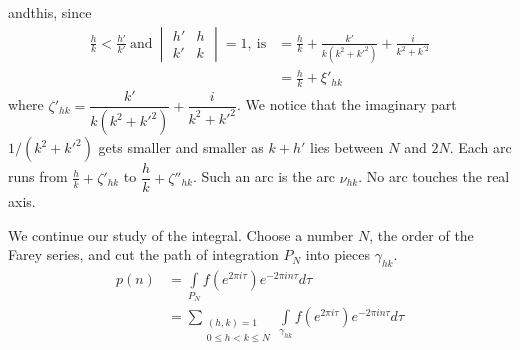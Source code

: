 \begin{figure}[H]
\end{figure}

\noindent and\pageoriginale this, since 
\begin{align*}
  \frac{h}{k}< \frac{h'}{k'} ~\text{and}~ 
  \begin{vmatrix}h' & h\\ k'&k \end{vmatrix}=1, ~\text{is} & =
  \frac{h}{k} + \frac{k'}{k(k^2 + k'^2)} + \frac{i}{k^2 + k^{'2}}\\
  & = \frac{h}{k} + \xi'_{hk}
\end{align*}
where $\zeta'_{hk}= \dfrac{k'}{k(k^2+ k'^2)} + \dfrac{i}{k^2 +k'^2}$. We
notice that the imaginary part $1/(k^2+k'^2)$ gets smaller and smaller
as $k+ h'$ lies between $N$ and $2N$. Each arc runs from $\frac{h}{k}
+ \zeta'_{hk}$ to $\dfrac{h}{k} + \zeta''_{hk}$. Such an arc is the arc
$\nu_{hk}$. No arc touches the real axis.

We continue our study of the integral. Choose a number $N$, the order
of the Farey series, and cut the path of integration $P_N$ into pieces
$\gamma_{hk}$. 
\begin{align*}
  p(n) & = \int\limits_{P_N} f(e^{2 \pi i \tau}) e^{- 2 \pi i n \tau} d \tau\\
  & = \sum_{\substack{(h, k)=1\\ 0 \leq h < k \leq N}}
  \int\limits_{\gamma_{hk}} f(e^{2 \pi i \tau}) e^{- 2 \pi i n \tau} d \tau
\end{align*}


